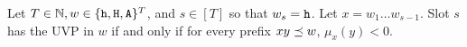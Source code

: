   




\begin{lemma}\label{lemma:uvp-margin}
  Let $T \in \mathbb{N}, w \in \{\mathtt{h}, \mathtt{H}, \mathtt{A}\}^T$, and 
  $s \in [T]$ so that $w_s = \mathtt{h}$. 
  Let $x = w_1 \ldots w_{s-1}$.
  Slot $s$ has the UVP in $w$ 
  if and only if 
  for every prefix $xy \preceq w$, 
  $\mu_x(y) < 0$. 
\end{lemma}



